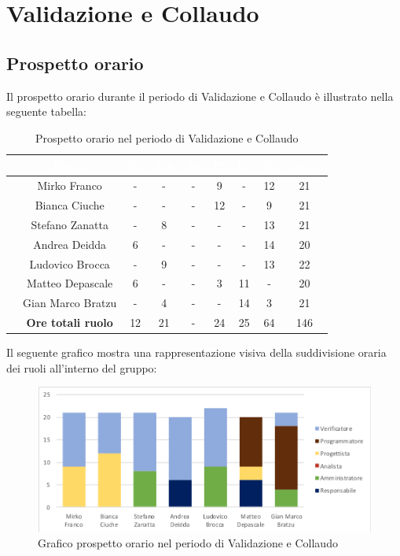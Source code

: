 \newpage
\section{Validazione e Collaudo}
\subsection{Prospetto orario}
Il prospetto orario durante il periodo di Validazione e Collaudo è illustrato nella seguente tabella:

\begin{table}[ht]
	\begin{center}
		\begin{tabular}{ccccccccc}
			\rowcolor{coolblack}
			\hline
			& \textcolor{white}{Nome} & \textcolor{white}{Re} & \textcolor{white}{Am} & \textcolor{white}{An} & \textcolor{white}{Pt} &\textcolor{white}{Pr} & \textcolor{white}{Ve} & \textcolor{white}{Totale} \\
			\hline
			&Mirko Franco & - & - & - & 9& - & 12 & 21  \\
			&Bianca Ciuche & -& -& - & 12 & - & 9 & 21 \\
			&Stefano Zanatta & - & 8& - & - & - & 13 & 21 \\
			&Andrea Deidda &  6& - & - & - & - & 14 & 20 \\
			&Ludovico Brocca & -& 9 & - & - & - & 13 & 22 \\
			&Matteo Depascale & 6& -& - & 3& 11& -& 20 \\
			&Gian Marco Bratzu & -& 4 & - & - & 14 & 3 & 21 \\
			\hline
			&\textbf{Ore totali ruolo} & 12& 21 & - & 24 & 25 & 64 & 146 \\
		\end{tabular}
		\caption{Prospetto orario nel periodo di Validazione e Collaudo}
	\end{center}
\end{table}

Il seguente grafico mostra una rappresentazione visiva della suddivisione oraria dei ruoli all'interno del gruppo:
\begin{figure}[!ht]
	\begin{center}
		\includegraphics[scale=0.90]{images/grafoValidazioneCollaudo.png}
		\caption{Grafico prospetto orario nel periodo di Validazione e Collaudo}
	\end{center}
\end{figure}

